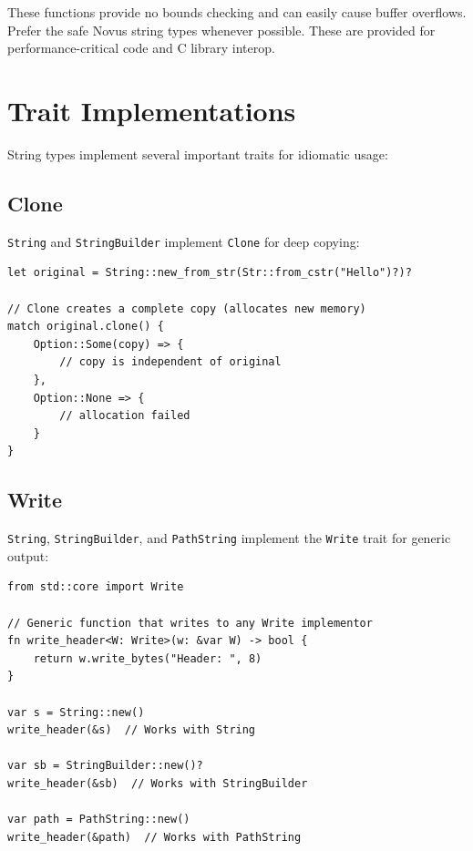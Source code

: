 \begin{warningbox}
These functions provide no bounds checking and can easily cause buffer overflows. Prefer the safe Novus string types whenever possible. These are provided for performance-critical code and C library interop.
\end{warningbox}

\section{Trait Implementations}
\label{sec:string-traits}

String types implement several important traits for idiomatic usage:

\subsection{Clone}

\texttt{String} and \texttt{StringBuilder} implement \texttt{Clone} for deep copying:

\begin{lstlisting}
let original = String::new_from_str(Str::from_cstr("Hello")?)?

// Clone creates a complete copy (allocates new memory)
match original.clone() {
    Option::Some(copy) => {
        // copy is independent of original
    },
    Option::None => {
        // allocation failed
    }
}
\end{lstlisting}

\subsection{Write}

\texttt{String}, \texttt{StringBuilder}, and \texttt{PathString} implement the \texttt{Write} trait for generic output:

\begin{lstlisting}
from std::core import Write

// Generic function that writes to any Write implementor
fn write_header<W: Write>(w: &var W) -> bool {
    return w.write_bytes("Header: ", 8)
}

var s = String::new()
write_header(&s)  // Works with String

var sb = StringBuilder::new()?
write_header(&sb)  // Works with StringBuilder

var path = PathString::new()
write_header(&path)  // Works with PathString
\end{lstlisting}


